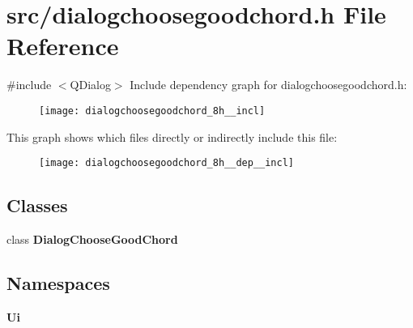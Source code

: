 \section{src/dialogchoosegoodchord.h File Reference}
\label{dialogchoosegoodchord_8h}
{\ttfamily \#include $<$Q\+Dialog$>$}\newline
Include dependency graph for dialogchoosegoodchord.\+h\+:\nopagebreak
\begin{figure}[H]
\begin{center}
\leavevmode
\texttt{[image: dialogchoosegoodchord\_8h\_\_incl]}
\end{center}
\end{figure}
This graph shows which files directly or indirectly include this file\+:\nopagebreak
\begin{figure}[H]
\begin{center}
\leavevmode
\texttt{[image: dialogchoosegoodchord\_8h\_\_dep\_\_incl]}
\end{center}
\end{figure}
\subsection*{Classes}
\begin{DoxyCompactItemize}
\item 
class \textbf{ Dialog\+Choose\+Good\+Chord}
\end{DoxyCompactItemize}
\subsection*{Namespaces}
\begin{DoxyCompactItemize}
\item 
 \textbf{ Ui}
\end{DoxyCompactItemize}
